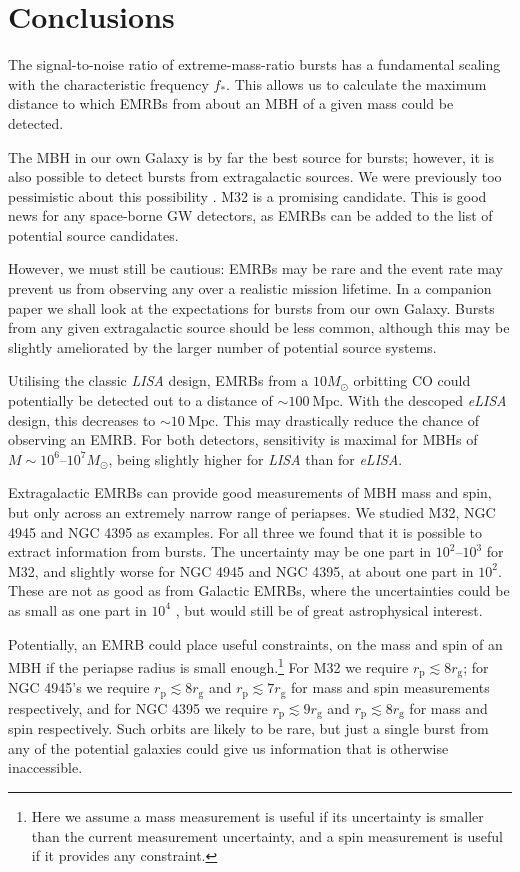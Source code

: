 \documentclass[useAMS,usedcolumn,usegraphicx,usenatbib]{mn2e}
\newcommand{\units}[1]{\ensuremath{~\mathrm{#1}}}
\newcommand{\sub}[1]{\ensuremath{_\mathrm{#1}}}
\begin{document}
\section{Conclusions}

The signal-to-noise ratio of extreme-mass-ratio bursts has a fundamental scaling with the characteristic frequency $f_\ast$. This allows us to calculate the maximum distance to which EMRBs from about an MBH of a given mass could be detected.

The MBH in our own Galaxy is by far the best source for bursts; however, it is also possible to detect bursts from extragalactic sources. We were previously too pessimistic about this possibility \citep{Berry2013}. M32 is a promising candidate. This is good news for any space-borne GW detectors, as EMRBs can be added to the list of potential source candidates.

However, we must still be cautious: EMRBs may be rare and the event rate may prevent us from observing any over a realistic mission lifetime. In a companion paper we shall look at the expectations for bursts from our own Galaxy. Bursts from any given extragalactic source should be less common, although this may be slightly ameliorated by the larger number of potential source systems.

Utilising the classic \textit{LISA} design, EMRBs from a $10 M_\odot$ orbitting CO could potentially be detected out to a distance of $\sim 100\units{Mpc}$. With the descoped \textit{eLISA} design, this decreases to $\sim 10\units{Mpc}$. This may drastically reduce the chance of observing an EMRB. For both detectors, sensitivity is maximal for MBHs of $M \sim 10^6$--$10^7 M_\odot$, being slightly higher for \textit{LISA} than for \textit{eLISA}.

Extragalactic EMRBs can provide good measurements of MBH mass and spin, but only across an extremely narrow range of periapses. We studied M32, NGC 4945 and NGC 4395 as examples. For all three we found that it is possible to extract information from bursts. The uncertainty may be one part in $10^2$--$10^3$ for M32, and slightly worse for NGC 4945 and NGC 4395, at about one part in $10^2$. These are not as good as from Galactic EMRBs, where the uncertainties could be as small as one part in $10^4$ \citep{Berry2013}, but would still be of great astrophysical interest.

Potentially, an EMRB could place useful constraints, on the mass and spin of an MBH if the periapse radius is small enough.\footnote{Here we assume a mass measurement is useful if its uncertainty is smaller than the current measurement uncertainty, and a spin measurement is useful if it provides any constraint.} For M32 we require $r\sub{p} \lesssim 8 r\sub{g}$; for NGC 4945's we require $r\sub{p} \lesssim 8 r\sub{g}$ and $r\sub{p} \lesssim 7 r\sub{g}$ for mass and spin measurements respectively, and for NGC 4395 we require $r\sub{p} \lesssim 9 r\sub{g}$ and $r\sub{p} \lesssim 8 r\sub{g}$ for mass and spin respectively. Such orbits are likely to be rare, but just a single burst from any of the potential galaxies could give us information that is otherwise inaccessible.
\end{document}
